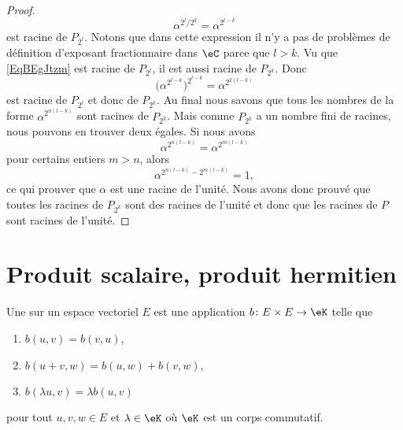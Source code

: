 \begin{proof}
    \begin{equation}    \label{EqBEgJtzm}
        \alpha^{2^l/2^k}=\alpha^{2^{l-k}}
    \end{equation}
    est racine de \( P_{2^l}\). Notons que dans cette expression il n'y a pas de problèmes de définition d'exposant fractionnaire dans \( \eC\) parce que \( l>k\). Vu que \eqref{EqBEgJtzm} est racine de \( P_{2^l}\), il est aussi racine de \( P_{2^k}\). Donc
    \begin{equation}
        \big( \alpha^{2^{l-k}} \big)^{2^{l-k}}=\alpha^{2^{2(l-k)}}
    \end{equation}
    est racine de \( P_{2^l}\) et donc de \( P_{2^k}\). Au final nous savons que tous les nombres de la forme \( \alpha^{2^{n(l-k)}}\) sont racines de \( P_{2^k}\). Mais comme \( P_{2^k}\) a un nombre fini de racines, nous pouvons en trouver deux égales. Si nous avons
    \begin{equation}
        \alpha^{2^{n(l-k)}}=\alpha^{2^{m(l-k)}}
    \end{equation}
    pour certains entiers \( m>n\), alors
    \begin{equation}
        \alpha^{2^{n(l-k)}-2^{m(l-k)}}=1,
    \end{equation}
    ce qui prouver que \( \alpha\) est une racine de l'unité. Nous avons donc prouvé que toutes les racines de \( P_{2^k}\) sont des racines de l'unité et donc que les racines de \( P\) sont racines de l'unité.
\end{proof}

\section{Produit scalaire, produit hermitien}

\begin{definition}      \label{DEFooEEQGooNiPjHz}
    Une  sur un espace vectoriel \( E\) est une application \( b\colon E\times E\to \eK\) telle que
    \begin{enumerate}
        \item
            \( b(u,v)=b(v,u)\),
        \item
            \( b(u+v,w)=b(u,w)+b(v,w)\),
        \item
            \( b(\lambda u,v)=\lambda b(u,v)\)
    \end{enumerate}
    pour tout \( u,v,w\in E\) et \( \lambda\in \eK\) où \( \eK\) est un corps commutatif.
\end{definition}

